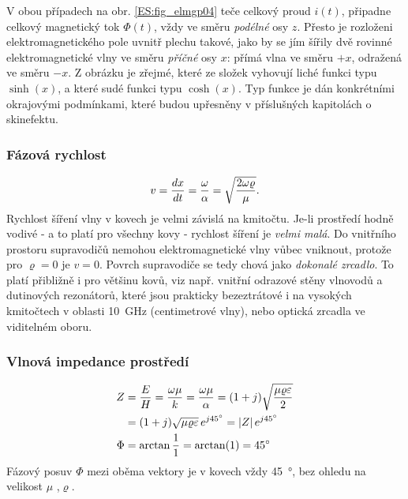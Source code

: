        V obou případech na obr. \ref{ES:fig_elmgp04} teče celkový proud \(i(t)\), připadne celkový 
        magnetický tok \(\Phi(t)\), vždy ve směru \emph{podélné} osy \(z\). Přesto je rozloženi 
        elektromagnetického pole uvnitř plechu takové, jako by se jím šířily dvě rovinné 
        elektromagnetické vlny ve směru \emph{příčné} osy \(x\): přímá vlna ve směru \(+x\), 
        odražená ve směru \(-x\). Z obrázku je zřejmé, které ze složek vyhovují liché funkci typu 
        \(
        \sinh(x)\), a které sudé funkci typu \(\cosh(x)\). Typ funkce je dán konkrétními okrajovými 
        podmínkami, které budou upřesněny v příslušných kapitolách o skinefektu.
       
        \subsubsection{Fázová rychlost}
          \begin{equation}\label{ES:eq_elmagp51}
            v = \dfrac{d x}{d t} = \frac{\omega}{\alpha} 
              = \sqrt{\dfrac{2\omega\varrho}{\mu}}.
          \end{equation}
          Rychlost šíření vlny v kovech je velmi závislá na kmitočtu. Je-li prostředí hodně 
          vodivé - a to platí pro všechny kovy - rychlost šíření je \emph{velmi malá}. Do vnitřního 
          prostoru supravodičů nemohou elektromagnetické vlny vůbec vniknout, protože pro \(\varrho 
          = 0\) je \(v = 0\). Povrch supravodiče se tedy chová jako \emph{dokonalé zrcadlo}. To 
          platí přibližně i pro většinu kovů, viz např. vnitřní odrazové stěny vlnovodů a 
          dutinových rezonátorů, které jsou prakticky bezeztrátové i na vysokých kmitočtech v 
          oblasti \SI{10}{\GHz} (centimetrové vlny), nebo optická zrcadla ve viditelném oboru.

        \subsubsection{Vlnová impedance prostředí}
          \begin{subequations}
            \begin{align}
                Z &= \frac{E}{H} = \frac{\omega\mu}{k} 
                   = \frac{\omega\mu}{\alpha} 
                   = (1+j)\sqrt{\frac{\mu\varrho\varepsilon}{2}}                      \nonumber \\
                  &= (1+j)\sqrt{\mu\varrho\varepsilon}\,e^{j\SI{45}{\degree}}         
                   =  \left\lvert Z\right\rvert e^{j\SI{45}{\degree}}                      \label{ES:eq_elmagp51a} \\
             \Phi &= \arctan\frac{1}{1} 
                   = \arctan(1) 
                   = \SI{45}{\degree}                                   \label{ES:eq_elmagp51b} 
            \end{align}
          \end{subequations}
          Fázový posuv \(\Phi\) mezi oběma vektory je v kovech vždy \SI{45}{\degree}, bez ohledu na 
          velikost \(\mu\) ,\(\varrho\).
          
